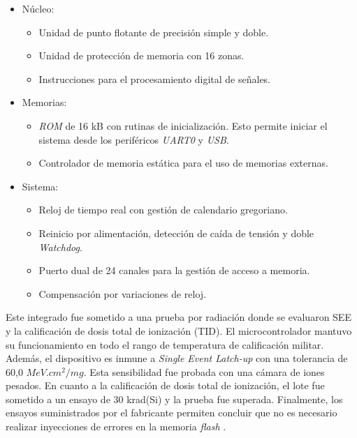 \begin{itemize}
    \item Núcleo:
        \begin{itemize}
            \item Unidad de punto flotante de precisión simple y doble.
            \item Unidad de protección de memoria con 16 zonas.
            \item Instrucciones para el procesamiento digital de señales.
        \end{itemize}
    \item Memorias:
        \begin{itemize}
            \item \emph{ROM} de 16 kB con rutinas de inicialización. Esto permite iniciar el sistema desde los periféricos \emph{UART0} y \emph{USB}.
            \item Controlador de memoria estática para el uso de memorias externas.
        \end{itemize}
    \item Sistema:
        \begin{itemize}
            \item Reloj de tiempo real con gestión de calendario gregoriano.
            \item Reinicio por alimentación, detección de caída de tensión y doble \emph{Watchdog}.
            \item Puerto dual de 24 canales para la gestión de acceso a memoria.
            \item Compensación por variaciones de reloj.
        \end{itemize}
\end{itemize}

\newpage

Este integrado fue sometido a una prueba por radiación donde se evaluaron SEE y la calificación de dosis total de ionización (TID).
El microcontrolador mantuvo su funcionamiento en todo el rango de temperatura de calificación militar.
Además, el dispositivo es inmune a \emph{Single Event Latch-up} con una tolerancia de 60,0 $MeV.cm^2/mg$.
Esta sensibilidad fue probada con una cámara de iones pesados.
En cuanto a la calificación de dosis total de ionización, el lote fue sometido a un ensayo de 30 krad(Si) y la prueba fue superada.
Finalmente, los ensayos suministrados por el fabricante permiten concluir que no es necesario realizar inyecciones de errores en la memoria \emph{flash} \citep{ARTICLE:dutrad}.

